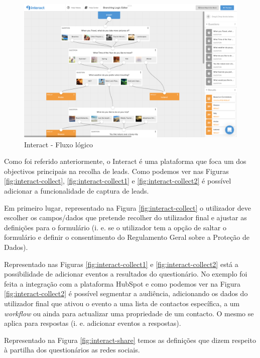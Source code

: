 \begin{figure}[ht!]
	\begin{center}
		\includegraphics[width=1\textwidth]{img/interact/logic}
		\caption{Interact - Fluxo lógico}
		\label{fig:interact-logic}
	\end{center}
\end{figure}

Como foi referido anteriormente, o Interact é uma plataforma que foca um dos objectivos principais na recolha de \gls{lead}s. Como podemos ver nas Figuras \ref{fig:interact-collect}, \ref{fig:interact-collect1} e \ref{fig:interact-collect2} é possível adicionar a funcionalidade de captura de leads. 

Em primeiro lugar, representado na Figura \ref{fig:interact-collect} o utilizador deve escolher os campos/dados que pretende recolher do utilizador final e ajustar as definições para o formulário (i. e. se o utilizador tem a opção de saltar o formulário e definir o consentimento do Regulamento Geral sobre a Proteção de Dados). 

Representado nas Figuras \ref{fig:interact-collect1} e \ref{fig:interact-collect2} está a possibilidade de adicionar eventos a resultados do questionário. No exemplo foi feita a integração com a plataforma HubSpot e como podemos ver na Figura \ref{fig:interact-collect2} é possível segmentar a audiência, adicionando os dados do utilizador final que ativou o evento a uma lista de contactos específica, a um \textit{workflow} ou ainda para actualizar uma propriedade de um contacto. O mesmo se aplica para respostas (i. e. adicionar eventos a respostas).

Representado na Figura \ref{fig:interact-share} temos as definições que dizem respeito à partilha dos questionários as redes sociais.



